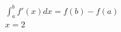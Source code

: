 \documentclass[preview]{standalone}
\begin{document}
\begin{align*}
\int_a^b f'( x ) d x  = f(b)- f(a)\\
             x =2
\end{align*}
\end{document}

